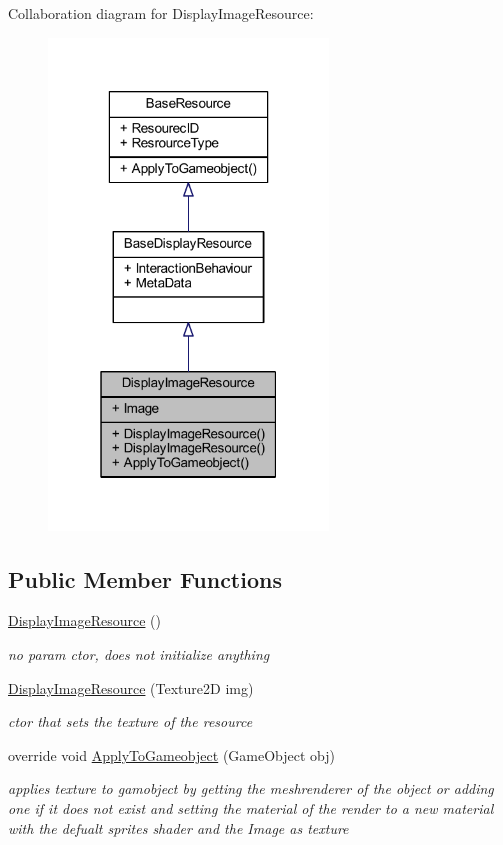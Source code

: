 Collaboration diagram for Display\+Image\+Resource\+:
\nopagebreak
\begin{figure}[H]
\begin{center}
\leavevmode
\includegraphics[width=211pt]{class_display_image_resource__coll__graph}
\end{center}
\end{figure}
\subsection*{Public Member Functions}
\begin{DoxyCompactItemize}
\item 
\mbox{\hyperlink{class_display_image_resource_a8c3e434da20e617201d74cfdb913817b}{Display\+Image\+Resource}} ()
\begin{DoxyCompactList}\small\item\em no param ctor, does not initialize anything \end{DoxyCompactList}\item 
\mbox{\hyperlink{class_display_image_resource_aa7b4bf3e8d324ea5b789322748b21b8e}{Display\+Image\+Resource}} (Texture2D img)
\begin{DoxyCompactList}\small\item\em ctor that sets the texture of the resource \end{DoxyCompactList}\item 
override void \mbox{\hyperlink{class_display_image_resource_a26992a5ecb6c449d85539cc5d07112e2}{Apply\+To\+Gameobject}} (Game\+Object obj)
\begin{DoxyCompactList}\small\item\em applies texture to gamobject by getting the meshrenderer of the object or adding one if it does not exist and setting the material of the render to a new material with the defualt sprites shader and the Image as texture \end{DoxyCompactList}\end{DoxyCompactItemize}
